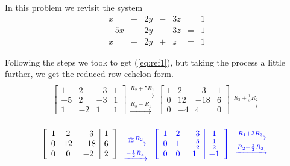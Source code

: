 \documentclass{ximera}
\begin{document}
\begin{exploration}\label{init:gaussianelim2} In this problem we revisit the system
$$\begin{array}{ccccccccc}
      x &+ &2y&-&3z&= &1 \\
	 -5x& +&2y&-&3z&=&1\\
      x&- &2y&+&z&=&1
    \end{array}$$
    
Following the steps we took to get (\ref{eq:ref1}), but taking the process a little further, we get the reduced row-echelon form.
$$\left[\begin{array}{ccc|c}  
 1&2&-3&1\\-5&2&-3&1\\1&-2&1&1
 \end{array}\right]
 \begin{array}{c}
 \\
 \xrightarrow{R_2+5R_1}\\
 \xrightarrow{R_3-R_1}\\
 \end{array}
\left[\begin{array}{ccc|c}  
 1&2&-3&1\\0&12&-18&6\\0&-4&4&0
 \end{array}\right]
 \begin{array}{c}
 \\
 \\
 \xrightarrow{R_3+\frac{1}{3}R_2}\\
 \end{array}$$
 $$\left[\begin{array}{ccc|c}  
 1&2&-3&1\\0&12&-18&6\\0&0&-2&2
 \end{array}\right]
  \color{blue}
 \begin{array}{c}
 \\
  \xrightarrow{\frac{1}{12}R_2}\\
 \xrightarrow{-\frac{1}{2}R_3}\\
 \end{array}
 \left[\begin{array}{ccc|c}  
 1&2&-3&1\\0&1&-\frac{3}{2}&\frac{1}{2}\\0&0&1&-1
 \end{array}\right]
  \begin{array}{c}
  \xrightarrow{R_1+3R_3}\\
 \xrightarrow{R_2+\frac{3}{2}R_3}\\

\end{array}$$
\end{exploration}
\end{document}
